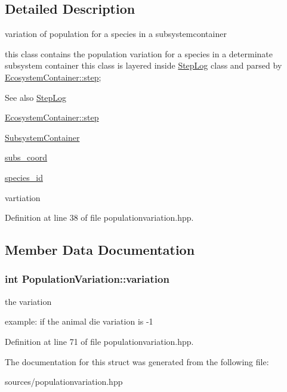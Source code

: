 \subsection{Detailed Description}
variation of population for a species in a subsystemcontainer 

this class contains the population variation for a species in a determinate subsystem container this class is layered inside \hyperlink{structStepLog}{StepLog} class and parsed by \hyperlink{classEcosystemContainer_a16d9614266ac07dc5252b1e731ab4712}{EcosystemContainer::step}; \begin{DoxySeeAlso}{See also}
\hyperlink{structStepLog}{StepLog} 

\hyperlink{classEcosystemContainer_a16d9614266ac07dc5252b1e731ab4712}{EcosystemContainer::step} 

\hyperlink{classSubsystemContainer}{SubsystemContainer} 

\hyperlink{structPopulationVariation_a287eca2a34e5c68d3066456396408e03}{subs\_\-coord} 

\hyperlink{structPopulationVariation_ad2f5ef6c52e0f3db00c5b5b66d7039e9}{species\_\-id} 

vartiation 
\end{DoxySeeAlso}


Definition at line 38 of file populationvariation.hpp.



\subsection{Member Data Documentation}
\hypertarget{structPopulationVariation_a1dc7b506e2e3d3a0ba8ce0390a9d2c7d}{
\subsubsection[{variation}]{\setlength{\rightskip}{0pt plus 5cm}int {\bf PopulationVariation::variation}}}
\label{structPopulationVariation_a1dc7b506e2e3d3a0ba8ce0390a9d2c7d}


the variation 

example: if the animal die variation is -\/1 

Definition at line 71 of file populationvariation.hpp.



The documentation for this struct was generated from the following file:\begin{DoxyCompactItemize}
\item 
sources/populationvariation.hpp\end{DoxyCompactItemize}
